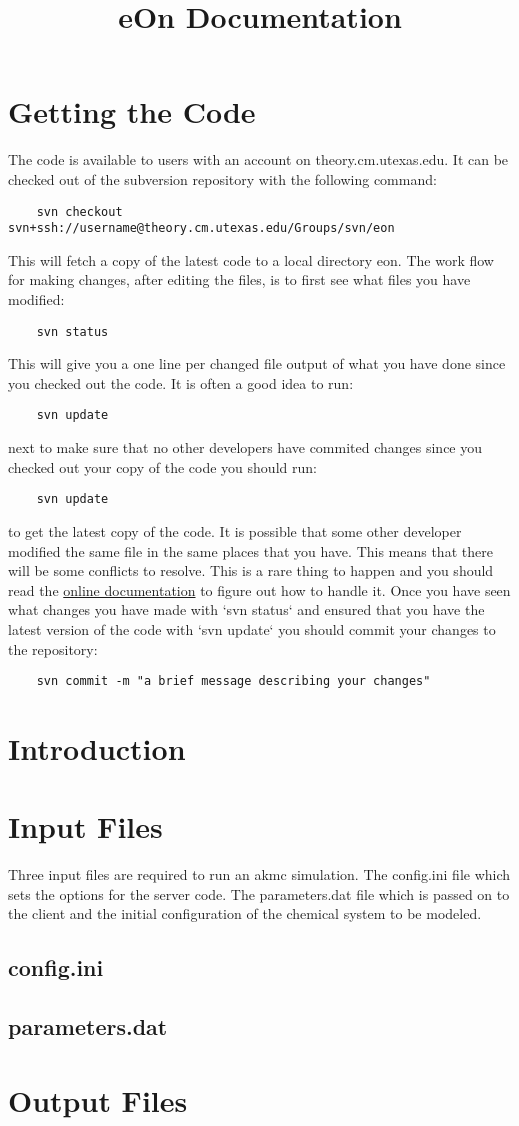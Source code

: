 \documentclass{article}
\begin{document}
\title{eOn Documentation}
\maketitle
\section{Getting the Code}
The code is available to users with an account on theory.cm.utexas.edu. It can
be checked out of the subversion repository with the following command:
\begin{verbatim}
    svn checkout svn+ssh://username@theory.cm.utexas.edu/Groups/svn/eon 
\end{verbatim}
This will fetch a copy of the latest code to a local directory eon.
The work flow for making changes, after editing the files, is to first see what
files you have modified:
\begin{verbatim}
    svn status
\end{verbatim}
This will give you a one line per changed file output of what you have done
since you checked out the code. It is often a good idea to run:
\begin{verbatim}
    svn update
\end{verbatim}
next to make sure that no other developers have commited changes since you
checked out your copy of the code you should run:
\begin{verbatim}
    svn update
\end{verbatim}
to get the latest copy of the code. It is possible that some other developer
modified the same file in the same places that you have. This means that there
will be some conflicts to resolve. This is a rare thing to happen and you
should read the \href{http://svnbook.red-bean.com/en/1.5/index.html}{online documentation} to figure out how to handle it. Once you have seen what changes you have made with `svn status` and ensured that you have the latest version of the code with `svn update` you should commit your changes to the repository:
\begin{verbatim}
    svn commit -m "a brief message describing your changes"
\end{verbatim}

\section{Introduction}

\section{Input Files}
Three input files are required to run an akmc simulation. The config.ini file
which sets the options for the server code. The parameters.dat file which is
passed on to the client and the initial configuration of the chemical system to
be modeled.

\subsection{config.ini}

\subsection{parameters.dat}

\section{Output Files}
\end{document}
